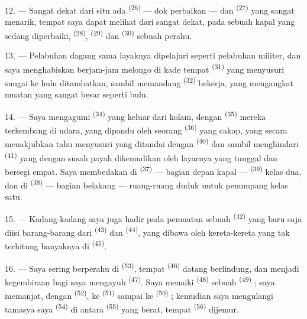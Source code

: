 12. --- Sangat dekat dari situ ada 
\textsuperscript{(26)} — dok perbaikan — dan 
\textsuperscript{(27)} yang sangat menarik, tempat saya dapat melihat
dari sangat dekat, pada sebuah kapal yang sedang diperbaiki,
 \textsuperscript{(28)}, 
\textsuperscript{(29)} dan  \textsuperscript{(30)} sebuah
perahu.

13. --- Pelabuhan dagang sama layaknya dipelajari seperti pelabuhan
militer, dan saya menghabiskan berjam-jam melongo di kade tempat
 \textsuperscript{(31)} yang menyusuri sungai
ke hulu ditambatkan, sambil memandang 
\textsuperscript{(32)} bekerja, yang mengangkat muatan yang sangat
besar seperti bulu.

\VUsaut{4.0mm}
\VUsaut{3.0mm}

14. --- Saya mengagumi 
\textsuperscript{(34)} yang keluar dari kolam, dengan
 \textsuperscript{(35)} mereka terkembang di
udara, yang dipandu oleh seorang 
\textsuperscript{(36)} yang cakap, yang secara menakjubkan tahu
menyusuri  yang ditandai dengan
 \textsuperscript{(40)} dan 
sambil menghindari 
\textsuperscript{(41)} yang dengan susah payah dikemudikan oleh
layarnya yang tunggal dan bersegi empat. Saya membedakan di
 \textsuperscript{(37)} — bagian depan kapal —
 \textsuperscript{(39)} kelas dua, dan di
 \textsuperscript{(38)} — bagian belakang — ruang-ruang
duduk untuk penumpang kelas satu.

15. --- Kadang-kadang saya juga hadir pada pemuatan sebuah
 \textsuperscript{(42)} yang baru saja diisi
barang-barang dari  \textsuperscript{(43)} dan
 \textsuperscript{(44)}, yang dibawa oleh
kereta-kereta yang tak terhitung banyaknya di 
\textsuperscript{(45)}.

\VUsaut{3.0mm}
\VUsaut{3.0mm}

16. --- Saya sering berperahu di 
\textsuperscript{(53)}, tempat 
\textsuperscript{(46)} datang berlindung, dan menjadi kegembiraan bagi
saya mengayuh  \textsuperscript{(47)}. Saya menaiki
 \textsuperscript{(48)} sebuah 
\textsuperscript{(49)} ; saya memanjat, dengan 
\textsuperscript{(52)}, ke  \textsuperscript{(51)} sampai
ke  \textsuperscript{(50)} ; kemudian saya
mengulangi tamasya saya  \textsuperscript{(54)} di
antara  \textsuperscript{(55)} yang berat,
tempat  \textsuperscript{(56)} dijemur.

